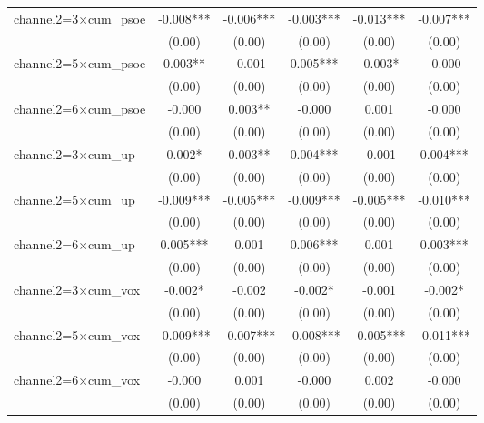 \begin{tabular}{l*{5}{c}}
channel2=3$\times$cum\_psoe&      -0.008***&      -0.006***&      -0.003***&      -0.013***&      -0.007***\\
                    &      (0.00)   &      (0.00)   &      (0.00)   &      (0.00)   &      (0.00)   \\
channel2=5$\times$cum\_psoe&       0.003** &      -0.001   &       0.005***&      -0.003*  &      -0.000   \\
                    &      (0.00)   &      (0.00)   &      (0.00)   &      (0.00)   &      (0.00)   \\
channel2=6$\times$cum\_psoe&      -0.000   &       0.003** &      -0.000   &       0.001   &      -0.000   \\
                    &      (0.00)   &      (0.00)   &      (0.00)   &      (0.00)   &      (0.00)   \\
channel2=3$\times$cum\_up&       0.002*  &       0.003** &       0.004***&      -0.001   &       0.004***\\
                    &      (0.00)   &      (0.00)   &      (0.00)   &      (0.00)   &      (0.00)   \\
channel2=5$\times$cum\_up&      -0.009***&      -0.005***&      -0.009***&      -0.005***&      -0.010***\\
                    &      (0.00)   &      (0.00)   &      (0.00)   &      (0.00)   &      (0.00)   \\
channel2=6$\times$cum\_up&       0.005***&       0.001   &       0.006***&       0.001   &       0.003***\\
                    &      (0.00)   &      (0.00)   &      (0.00)   &      (0.00)   &      (0.00)   \\
channel2=3$\times$cum\_vox&      -0.002*  &      -0.002   &      -0.002*  &      -0.001   &      -0.002*  \\
                    &      (0.00)   &      (0.00)   &      (0.00)   &      (0.00)   &      (0.00)   \\
channel2=5$\times$cum\_vox&      -0.009***&      -0.007***&      -0.008***&      -0.005***&      -0.011***\\
                    &      (0.00)   &      (0.00)   &      (0.00)   &      (0.00)   &      (0.00)   \\
channel2=6$\times$cum\_vox&      -0.000   &       0.001   &      -0.000   &       0.002   &      -0.000   \\
                    &      (0.00)   &      (0.00)   &      (0.00)   &      (0.00)   &      (0.00)   \\

\end{tabular}
